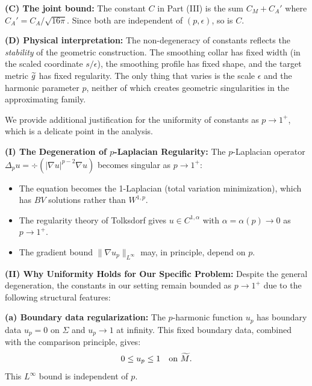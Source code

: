 \begin{remark}
\textbf{(C) The joint bound:}
The constant $C$ in Part (III) is the sum $C_M + C_A'$ where $C_A' = C_A / \sqrt{16\pi}$. Since both are independent of $(p, \epsilon)$, so is $C$.

\textbf{(D) Physical interpretation:}
The non-degeneracy of constants reflects the \emph{stability} of the geometric construction. The smoothing collar has fixed width (in the scaled coordinate $s/\epsilon$), the smoothing profile has fixed shape, and the target metric $\widetilde{g}$ has fixed regularity. The only thing that varies is the scale $\epsilon$ and the harmonic parameter $p$, neither of which creates geometric singularities in the approximating family.
\end{remark}

\begin{remark}\label{rem:pUniformity}
We provide additional justification for the uniformity of constants as $p \to 1^+$, which is a delicate point in the analysis.

\textbf{(I) The Degeneration of $p$-Laplacian Regularity:}
The $p$-Laplacian operator $\Delta_p u = \div(|\nabla u|^{p-2} \nabla u)$ becomes singular as $p \to 1^+$:
\begin{itemize}
    \item The equation becomes the 1-Laplacian (total variation minimization), which has $BV$ solutions rather than $W^{1,p}$.
    \item The regularity theory of Tolksdorf \cite{tolksdorf1984} gives $u \in C^{1,\alpha}$ with $\alpha = \alpha(p) \to 0$ as $p \to 1^+$.
    \item The gradient bound $\|\nabla u_p\|_{L^\infty}$ may, in principle, depend on $p$.
\end{itemize}

\textbf{(II) Why Uniformity Holds for Our Specific Problem:}
Despite the general degeneration, the constants in our setting remain bounded as $p \to 1^+$ due to the following structural features:

\textbf{(a) Boundary data regularization:} The $p$-harmonic function $u_p$ has boundary data $u_p = 0$ on $\Sigma$ and $u_p \to 1$ at infinity. This fixed boundary data, combined with the comparison principle, gives:
\begin{equation}
    0 \le u_p \le 1 \quad \text{on } \widetilde{M}.
\end{equation}
This $L^\infty$ bound is independent of $p$.


\end{remark}
